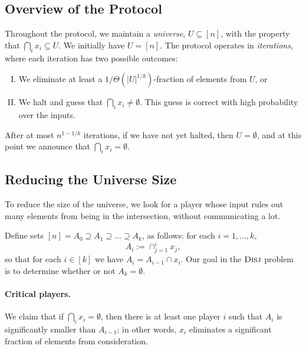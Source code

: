 \documentclass{article}
\newcommand{\coloneq}{:=}
\newcommand{\prob}[1]{\ensuremath{\text{\textsc{#1}}}}
\theoremstyle{plain}
\begin{document}
\subsection{Overview of the Protocol}
Throughout the protocol, we maintain a \emph{universe}, $U \subseteq [n]$,
with the property that $\bigcap_i x_i \subseteq U$.
We initially have $U = [n]$.
The protocol operates in \emph{iterations}, where each iteration has two possible outcomes:
\begin{enumerate}[I.]
  \item We eliminate at least a $1/\Theta(|U|^{1/k})$-fraction of elements from $U$, or
  \item We halt and guess that $\bigcap_i x_i \neq \emptyset$. This guess is correct with high probability over the inputs.
\end{enumerate}
After at most $n^{1 - 1/k}$ iterations, if we have not yet halted,
then $U = \emptyset$, and at this point we announce that $\bigcap_i x_i = \emptyset$.

\subsection{Reducing the Universe Size}
To reduce the size of the universe, we look for a player whose input rules out many elements from being in the intersection,
without communicating a lot.

Define sets $[n] = A_0 \supseteq A_1 \supseteq \ldots \supseteq A_k$, as follows:
for each $i = 1,\ldots,k$,
\begin{equation*}
  A_i \coloneq \cap_{j = 1}^i x_j,
\end{equation*}
so that for each $i \in [k]$ we have $A_i = A_{i-1} \cap x_i$.
Our goal in the $\prob{Disj}$ problem is to determine whether or not $A_k = \emptyset$.

\paragraph{Critical players.}
We claim that if $\bigcap_i x_i = \emptyset$, then there is at least one player $i$ such that $A_i$ is significantly smaller than $A_{i - 1}$;
in other words, $x_i$ eliminates a significant fraction of elements from consideration.
\end{document}
